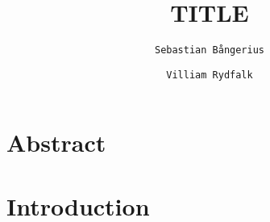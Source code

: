 \documentclass[10pt,a4paper]{article}
\author{
  \texttt{Sebastian Bångerius}
  \and
  \texttt{Villiam Rydfalk}
}
\begin{document}

\title{TITLE}
\maketitle

\cleardoublepage


\section{Abstract}


\section{Introduction}
\end{document}
